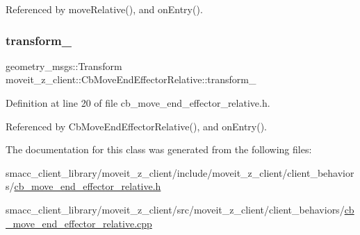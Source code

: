Referenced by move\+Relative(), and on\+Entry().

\mbox{\label{classmoveit__z__client_1_1CbMoveEndEffectorRelative_a0686340d0328df4d0ecb962b61026f43}} 
\subsubsection{\texorpdfstring{transform\+\_\+}{transform\_}}
{\footnotesize\ttfamily geometry\+\_\+msgs\+::\+Transform moveit\+\_\+z\+\_\+client\+::\+Cb\+Move\+End\+Effector\+Relative\+::transform\+\_\+}



Definition at line 20 of file cb\+\_\+move\+\_\+end\+\_\+effector\+\_\+relative.\+h.



Referenced by Cb\+Move\+End\+Effector\+Relative(), and on\+Entry().



The documentation for this class was generated from the following files\+:\begin{DoxyCompactItemize}
\item 
smacc\+\_\+client\+\_\+library/moveit\+\_\+z\+\_\+client/include/moveit\+\_\+z\+\_\+client/client\+\_\+behaviors/\hyperlink{cb__move__end__effector__relative_8h}{cb\+\_\+move\+\_\+end\+\_\+effector\+\_\+relative.\+h}\item 
smacc\+\_\+client\+\_\+library/moveit\+\_\+z\+\_\+client/src/moveit\+\_\+z\+\_\+client/client\+\_\+behaviors/\hyperlink{cb__move__end__effector__relative_8cpp}{cb\+\_\+move\+\_\+end\+\_\+effector\+\_\+relative.\+cpp}\end{DoxyCompactItemize}
